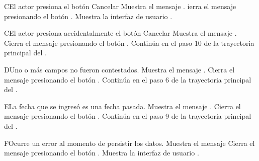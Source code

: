 
\begin{UCtrayectoriaA}{C}{El actor presiona el botón Cancelar}
    \UCpaso Muestra el mensaje .
    \UCpaso[\UCactor] ierra el mensaje presionando el botón .
    \UCpaso Muestra la interfaz de usuario .
\end{UCtrayectoriaA}


\begin{UCtrayectoriaA}{C}{El actor presiona accidentalmente el botón Cancelar}
    \UCpaso Muestra el mensaje .
    \UCpaso[\UCactor] Cierra el mensaje presionando el botón .
    \UCpaso Continúa en el paso 10 de la trayectoria principal del .
\end{UCtrayectoriaA}


\begin{UCtrayectoriaA}{D}{Uno o más campos no fueron contestados.}
    \UCpaso Muestra el mensaje .
    \UCpaso[\UCactor] Cierra el mensaje presionando el botón .
    \UCpaso Continúa en el paso 6 de la trayectoria principal del .
\end{UCtrayectoriaA}


\begin{UCtrayectoriaA}{E}{La fecha que se ingresó es una fecha pasada.}
    \UCpaso Muestra el mensaje .
    \UCpaso[\UCactor] Cierra el mensaje presionando el botón .
    \UCpaso Continúa en el paso 9 de la trayectoria principal del .
\end{UCtrayectoriaA}


\begin{UCtrayectoriaA}{F}{Ocurre un error al momento de persistir los datos.}
    \UCpaso Muestra el mensaje 
    \UCpaso[\UCactor] Cierra el mensaje presionando el botón .
    \UCpaso Muestra la interfaz de usuario .
\end{UCtrayectoriaA}